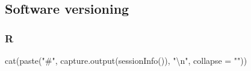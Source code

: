 \documentclass[
  12pt,
]{article}
\newenvironment{Shaded}{\begin{snugshade}}{\end{snugshade}}
\newcommand{\AttributeTok}[1]{\textcolor[rgb]{0.77,0.63,0.00}{#1}}
\newcommand{\FunctionTok}[1]{\textcolor[rgb]{0.00,0.00,0.00}{#1}}
\newcommand{\NormalTok}[1]{#1}
\newcommand{\SpecialCharTok}[1]{\textcolor[rgb]{0.00,0.00,0.00}{#1}}
\newcommand{\StringTok}[1]{\textcolor[rgb]{0.31,0.60,0.02}{#1}}
\begin{document}
\hypertarget{software-versioning}{%
\subsection{Software versioning}\label{software-versioning}}

\hypertarget{r}{%
\subsubsection{R}\label{r}}

\begin{Shaded}
\begin{Highlighting}[]
\FunctionTok{cat}\NormalTok{(}\FunctionTok{paste}\NormalTok{(}\StringTok{"\#"}\NormalTok{, }\FunctionTok{capture.output}\NormalTok{(}\FunctionTok{sessionInfo}\NormalTok{()), }\StringTok{"}\SpecialCharTok{\textbackslash{}n}\StringTok{"}\NormalTok{, }\AttributeTok{collapse  =} \StringTok{""}\NormalTok{))}
\end{Highlighting}
\end{Shaded}
\end{document}
